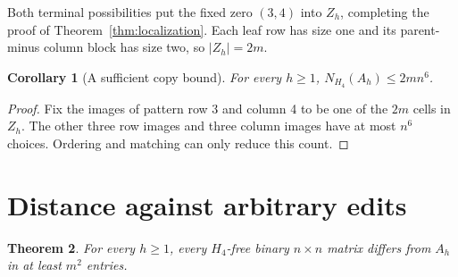 \documentclass[11pt,a4paper]{article}
\newtheorem{theorem}{Theorem}[section]
\newtheorem{corollary}[theorem]{Corollary}
\theoremstyle{remark}
\newcommand{\Hfour}{H_4}
\begin{document}
Both terminal possibilities put the fixed zero \((3,4)\) into
\(Z_h\), completing the proof of Theorem~\ref{thm:localization}.
Each leaf row has size one and its parent-minus column block has
size two, so \(|Z_h|=2m\).

\begin{corollary}[A sufficient copy bound]\label{cor:sparsecount}
For every \(h\ge1\), \(N_{\Hfour}(A_h)\le2mn^6\).
\end{corollary}
\begin{proof}
Fix the images of pattern row 3 and column 4 to be one of the
\(2m\) cells in \(Z_h\). The other three row images and three
column images have at most \(n^6\) choices. Ordering and matching
can only reduce this count.
\end{proof}

\section{Distance against arbitrary edits}\label{sec:distance}
\begin{theorem}\label{thm:distance}
For every \(h\ge1\), every \(\Hfour\)-free binary \(n\times n\)
matrix differs from \(A_h\) in at least \(m^2\) entries.
\end{theorem}
\end{document}
